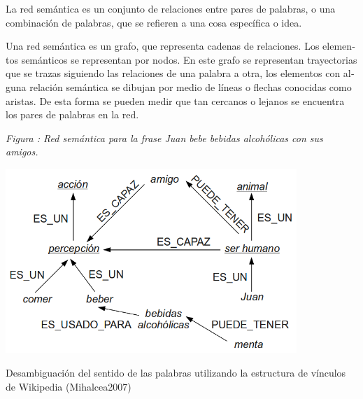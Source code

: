 \documentclass[letterpaper]{article}
\newcommand\textstylebibuscitbase[1]{#1}
\newcounter{Figura}
\renewcommand\theFigura{\arabic{Figura}}
\begin{document}
\bigskip

{\sffamily
\textstylebibuscitbase{\foreignlanguage{spanish}{La red sem\'antica es
un conjunto de relaciones entre pares de palabras, o una combinaci\'on
de palabras, que se refieren a una cosa espec\'ifica o idea. }}}


\bigskip

{\sffamily
\textstylebibuscitbase{\foreignlanguage{spanish}{Una red sem\'antica es
un grafo, que representa cadenas de relaciones. Los
}}\textstylebibuscitbase{\foreignlanguage{spanish}{elementos
}}\textstylebibuscitbase{\foreignlanguage{spanish}{sem\'anticos
s}}\textstylebibuscitbase{\foreignlanguage{spanish}{e representan por
nodos. En este grafo se representan trayectorias que se trazas
siguiendo las relaciones de una palabra a otra,
l}}\textstylebibuscitbase{\foreignlanguage{spanish}{os elementos con
alguna relaci\'on sem\'antica se dibujan por medio de l\'ineas o
flechas conocidas como
}}\textstylebibuscitbase{\foreignlanguage{spanish}{aristas. De esta
forma se pueden medir que tan cercanos o lejanos se encuentra los pares
de palabras en la red.}}}



\begin{center}
\begin{minipage}{11.019cm}
{\centering{}\itshape
Figura \stepcounter{Figura}{\theFigura}: Red sem\'antica para la frase
Juan bebe bebidas alcoh\'olicas con sus amigos.
\par}
\includegraphics[width=11.019cm,height=6.969cm]{Capitulo2-img12.png}\end{minipage}
\end{center}
{\sffamily
\textstylebibuscitbase{\foreignlanguage{spanish}{Desambiguaci\'on del
sentido de las palabras utilizando la estructura de v\'inculos de
Wikipedia
}}\textstylebibuscitbase{\foreignlanguage{spanish}{(Mihalcea2007)}}}
\end{document}
